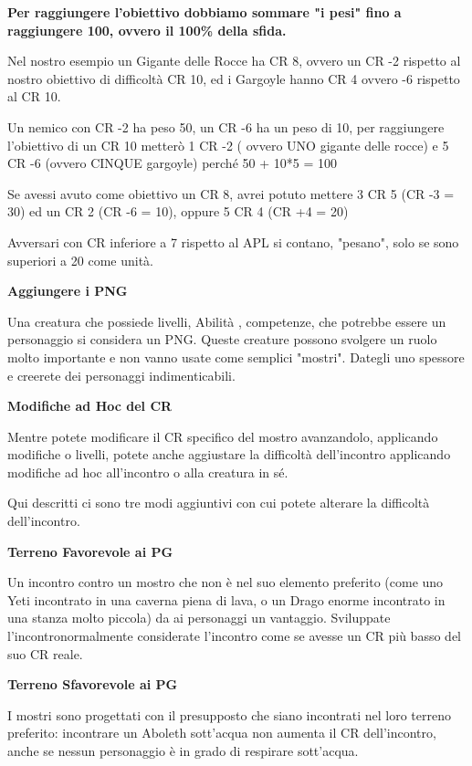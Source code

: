 \documentclass[a4paper,11pt,twoside,openany]{book}
\begin{document}
\bigskip

\textbf{Per raggiungere l'obiettivo dobbiamo sommare "i pesi"
	fino a raggiungere 100, ovvero il 100\% della sfida.}

Nel nostro esempio un Gigante delle Rocce ha CR 8, ovvero un CR -2 rispetto al nostro obiettivo di difficoltà CR 10, ed i Gargoyle hanno CR 4 ovvero -6 rispetto al CR 10.

Un nemico con CR -2 ha peso 50, un CR -6 ha un peso di 10, per raggiungere l'obiettivo di un CR 10 metterò 1 CR -2 ( ovvero UNO gigante delle rocce) e 5 CR -6 (ovvero CINQUE gargoyle) perché 50 + 10{*}5 = 100

Se avessi avuto come obiettivo un CR 8, avrei potuto mettere 3 CR 5 (CR -3 = 30) ed un CR 2 (CR -6 = 10), oppure 5 CR 4 (CR +4 = 20)

Avversari con CR inferiore a 7 rispetto al APL si contano, "pesano", solo se sono superiori a 20 come unità.

\textbf{Aggiungere i PNG}

Una creatura che possiede livelli, Abilità , competenze, che potrebbe essere un personaggio si considera un PNG. Queste creature possono svolgere un ruolo molto importante e non vanno usate come semplici "mostri". Dategli uno spessore e creerete dei personaggi indimenticabili.

\textbf{Modifiche ad Hoc del CR}

Mentre potete modificare il CR specifico del mostro avanzandolo, applicando modifiche o livelli, potete anche aggiustare la difficoltà dell'incontro applicando modifiche ad hoc all'incontro o alla creatura in sé.

Qui descritti ci sono tre modi aggiuntivi con cui potete alterare la difficoltà dell'incontro.

\textbf{Terreno Favorevole ai PG}

Un incontro contro un mostro che non è nel suo elemento preferito (come uno Yeti incontrato in una caverna piena di lava, o un Drago enorme incontrato in una stanza molto piccola) da ai personaggi un vantaggio. Sviluppate l'incontronormalmente considerate l'incontro come se avesse un CR più basso del suo CR reale.

\textbf{Terreno Sfavorevole ai PG}

I mostri sono progettati con il presupposto che siano incontrati nel loro terreno preferito: incontrare un Aboleth sott’acqua non aumenta il CR dell'incontro, anche se nessun personaggio è in grado di respirare sott'acqua.
\end{document}
